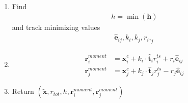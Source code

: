 \begin{enumerate}
\item Find 
\begin{align}
h = \min(\mathbf{h})
\end{align}
and track minimizing values
\begin{align}
\hat{\mathbf{e}}_{ij}, k_{i}, k_{j}, r_{i}, _{j}
\end{align}

\item 

\begin{align}
\mathbf{r}_{i}^{moment} &= \mathbf{x}_{i}^{c} + k_{i} \cdot \hat{\mathbf{t}}_{i} r_{i}^{ts} + r_{i} \hat{\mathbf{e}}_{ij} \\
\mathbf{r}_{j}^{moment} &= \mathbf{x}_{j}^{c} + k_{j} \cdot \hat{\mathbf{t}}_{j} r_{j}^{ts} - r_{j} \hat{\mathbf{e}}_{ij}
\end{align}

\item Return $ (\tilde{\mathbf{x}}, r_{tot}, h, \mathbf{r}_{i}^{moment}, \mathbf{r}_{j}^{moment}) $

\end{enumerate}




